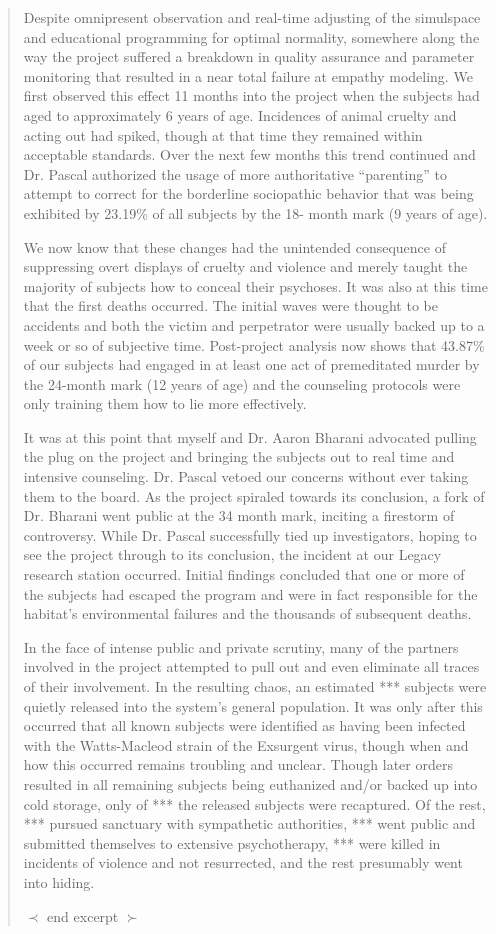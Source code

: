 \begin{quotation}
Despite omnipresent observation and
real-time adjusting of the simulspace and educational
programming for optimal normality,
somewhere along the way the project suffered
a breakdown in quality assurance and parameter
monitoring that resulted in a near total
failure at empathy modeling. We first observed
this effect 11 months into the project when the
subjects had aged to approximately 6 years of
age. Incidences of animal cruelty and acting
out had spiked, though at that time they remained
within acceptable standards. Over the
next few months this trend continued and Dr.
Pascal authorized the usage of more authoritative
“parenting” to attempt to correct for the
borderline sociopathic behavior that was being
exhibited by 23.19\% of all subjects by the 18-
month mark (9 years of age).

We now know that these changes had
the unintended consequence of suppressing
overt displays of cruelty and violence and
merely taught the majority of subjects how
to conceal their psychoses. It was also at this
time that the first deaths occurred. The initial
waves were thought to be accidents and
both the victim and perpetrator were usually
backed up to a week or so of subjective time.
Post-project analysis now shows that 43.87\%
of our subjects had engaged in at least one
act of premeditated murder by the 24-month
mark (12 years of age) and the counseling
protocols were only training them how to lie
more effectively.

It was at this point that myself and Dr.
Aaron Bharani advocated pulling the plug on
the project and bringing the subjects out to
real time and intensive counseling. Dr. Pascal
vetoed our concerns without ever taking them
to the board. As the project spiraled towards
its conclusion, a fork of Dr. Bharani went public
at the 34 month mark, inciting a firestorm of
controversy. While Dr. Pascal successfully tied
up investigators, hoping to see the project
through to its conclusion, the incident at our
Legacy research station occurred. Initial findings
concluded that one or more of the subjects
had escaped the program and were in fact
responsible for the habitat’s environmental failures
and the thousands of subsequent deaths.

In the face of intense public and private
scrutiny, many of the partners involved in
the project attempted to pull out and even
eliminate all traces of their involvement. In the
resulting chaos, an estimated *** subjects
were quietly released into the system’s general
population. It was only after this occurred that
all known subjects were identified as having
been infected with the Watts-Macleod strain
of the Exsurgent virus, though when and how
this occurred remains troubling and unclear.
Though later orders resulted in all remaining
subjects being euthanized and/or backed up
into cold storage, only of *** the released
subjects were recaptured. Of the rest, *** pursued
sanctuary with sympathetic authorities,
*** went public and submitted themselves
to extensive psychotherapy, *** were killed in
incidents of violence and not resurrected, and
the rest presumably went into hiding.

$\prec$ end excerpt $\succ$ 
\end{quotation}
